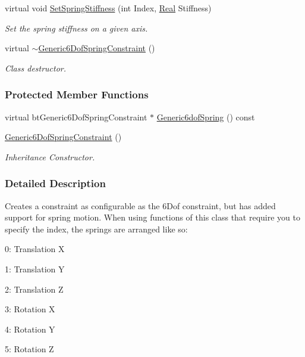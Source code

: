 \begin{DoxyCompactItemize}
virtual void \hyperlink{classphys_1_1Generic6DofSpringConstraint_a7a73106f73e23320cc84593aade54301}{SetSpringStiffness} (int Index, \hyperlink{namespacephys_af7eb897198d265b8e868f45240230d5f}{Real} Stiffness)
\begin{DoxyCompactList}\small\item\em Set the spring stiffness on a given axis. \item\end{DoxyCompactList}\item 
virtual \hyperlink{classphys_1_1Generic6DofSpringConstraint_a66a886a64c86a24ed34eacf4c8465f10}{$\sim$Generic6DofSpringConstraint} ()
\begin{DoxyCompactList}\small\item\em Class destructor. \item\end{DoxyCompactList}\end{DoxyCompactItemize}
\subsubsection*{Protected Member Functions}
\begin{DoxyCompactItemize}
\item 
virtual btGeneric6DofSpringConstraint $\ast$ \hyperlink{classphys_1_1Generic6DofSpringConstraint_a9b8621e2f9cd34fe183de6e664959027}{Generic6dofSpring} () const 
\item 
\hyperlink{classphys_1_1Generic6DofSpringConstraint_aeca02121a3d7d2416a611c2f7274c1a6}{Generic6DofSpringConstraint} ()
\begin{DoxyCompactList}\small\item\em Inheritance Constructor. \item\end{DoxyCompactList}\end{DoxyCompactItemize}


\subsubsection{Detailed Description}
Creates a constraint as configurable as the 6Dof constraint, but has added support for spring motion. When using functions of this class that require you to specify the index, the springs are arranged like so: \par

\begin{DoxyItemize}
\item 0: Translation X
\item 1: Translation Y
\item 2: Translation Z
\item 3: Rotation X
\item 4: Rotation Y
\item 5: Rotation Z 
\end{DoxyItemize}

